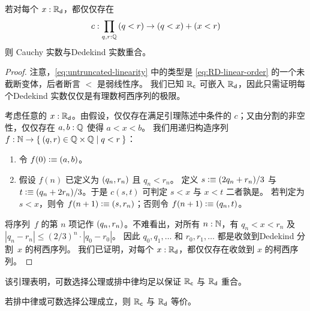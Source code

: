 \begin{lem} \label{lem:untruncated-linearity-reals-coincide}
  若对每个 $x : \mathbb{R}_\mathsf{d}$，都仅仅存在
  \begin{equation}
    \label{eq:untruncated-linearity}
    c : \prd{q, r : \Q} (q < r) \to (q < x) + (x < r)
  \end{equation}
  则 Cauchy 实数与Dedekind 实数重合。
\end{lem}

\begin{proof}
  注意，\eqref{eq:untruncated-linearity} 中的类型是 \eqref{eq:RD-linear-order} 的一个未截断变体，后者断言 $<$ 是弱线性序。
  我们已知 $\mathbb{R}_\mathsf{c}$ 可嵌入 $\mathbb{R}_\mathsf{d}$，因此只需证明每个Dedekind 实数仅仅是有理数柯西序列的极限。

  考虑任意的 $x : \mathbb{R}_\mathsf{d}$。由假设，仅仅存在满足引理陈述中条件的 $c$；又由分割的非空性，仅仅存在 $a, b : \mathbb{Q}$ 使得 $a < x < b$。
  我们用递归构造序列 $f : \N \to \setof{ \pairr{q, r} \in \Q \times \Q | q < r }$：
  \begin{enumerate}
  \item 令 $f(0) \vcentcolon\equiv {\mathopen{}(a, b)\mathclose{}}$。
  \item 假设 $f(n)$ 已定义为 ${\mathopen{}(q_n, r_n)\mathclose{}}$ 且 $q_n < r_n$。
    定义 $s \vcentcolon\equiv (2 q_n + r_n)/3$ 与 $t \vcentcolon\equiv (q_n + 2 r_n)/3$。于是 $c(s,t)$ 可判定 $s < x$ 与 $x < t$ 二者孰是。
    若判定为 $s < x$，则令 $f(n+1) \vcentcolon\equiv
    {\mathopen{}(s, r_n)\mathclose{}}$；否则令 $f(n+1) \vcentcolon\equiv {\mathopen{}(q_n, t)\mathclose{}}$。
  \end{enumerate}
  将序列~$f$ 的第 $n$ 项记作 ${\mathopen{}(q_n, r_n)\mathclose{}}$。不难看出，对所有 $n : \mathbb{N}$，有 $q_n < x < r_n$ 及 $|q_n - r_n| \leq (2/3)^n \cdot |q_0 - r_0|$。
  因此 $q_0, q_1, \ldots$ 和 $r_0, r_1, \ldots$ 都是收敛到Dedekind 分割~$x$ 的柯西序列。
  我们已证明，对每个 $x : \mathbb{R}_\mathsf{d}$，都仅仅存在收敛到 $x$ 的柯西序列。
\end{proof}

该引理表明，可数选择公理或排中律均足以保证 $\mathbb{R}_\mathsf{c}$ 与 $\mathbb{R}_\mathsf{d}$ 重合。

\begin{cor} \label{when-reals-coincide}
  若排中律或可数选择公理成立，则 $\mathbb{R}_\mathsf{c}$ 与 $\mathbb{R}_\mathsf{d}$ 等价。
\end{cor}

